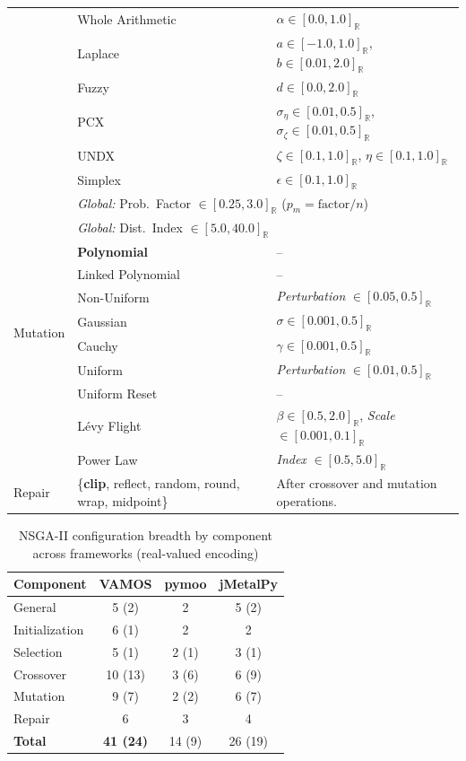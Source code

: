 \documentclass[journal]{IEEEtran}
\newcommand{\Realdomain}[1]{[#1]_{\mathbb{R}}}
\begin{document}
\begin{table}[htbp]
\begin{tabular}{lll}
 & Whole Arithmetic & $\alpha \in \Realdomain{0.0, 1.0}$ \\
 & Laplace & $a \in \Realdomain{-1.0, 1.0}$, $b \in \Realdomain{0.01, 2.0}$ \\
 & Fuzzy & $d \in \Realdomain{0.0, 2.0}$ \\
 & PCX & $\sigma_\eta \in \Realdomain{0.01, 0.5}$, $\sigma_\zeta \in \Realdomain{0.01, 0.5}$ \\
 & UNDX & $\zeta \in \Realdomain{0.1, 1.0}$, $\eta \in \Realdomain{0.1, 1.0}$ \\
 & Simplex & $\epsilon \in \Realdomain{0.1, 1.0}$ \\ \midrule
\multirow{11}{*}{Mutation} & \multicolumn{2}{l}{\textit{Global:} Prob.\ Factor $\in \Realdomain{0.25, 3.0}$ ($p_m = \text{factor}/n$)} \\
 & \multicolumn{2}{l}{\textit{Global:} Dist.\ Index $\in \Realdomain{5.0, 40.0}$} \\
 & \textbf{Polynomial} & -- \\
 & Linked Polynomial & -- \\
 & Non-Uniform & \textit{Perturbation} $\in \Realdomain{0.05, 0.5}$ \\
 & Gaussian & $\sigma \in \Realdomain{0.001, 0.5}$ \\
 & Cauchy & $\gamma \in \Realdomain{0.001, 0.5}$ \\
 & Uniform & \textit{Perturbation} $\in \Realdomain{0.01, 0.5}$ \\
 & Uniform Reset & -- \\
 & L\'evy Flight & $\beta \in \Realdomain{0.5, 2.0}$, \textit{Scale} $\in \Realdomain{0.001, 0.1}$ \\
 & Power Law & \textit{Index} $\in \Realdomain{0.5, 5.0}$ \\ \midrule
\multirow{1}{*}{Repair} & \{\textbf{clip}, reflect, random, round, wrap, midpoint\} & After crossover and mutation operations. \\ \bottomrule
\end{tabular}%
\end{table}

\begin{table}[htbp]
\centering
\caption{NSGA-II configuration breadth by component across frameworks (real-valued encoding)}
\label{tab:parameter_space_summary}
\begin{tabular}{lccc}
\toprule
\textbf{Component} & \textbf{VAMOS} & \textbf{pymoo} & \textbf{jMetalPy} \\
\midrule
General & 5 (2) & 2 & 5 (2) \\
Initialization & 6 (1) & 2 & 2 \\
Selection & 5 (1) & 2 (1) & 3 (1) \\
Crossover & 10 (13) & 3 (6) & 6 (9) \\
Mutation & 9 (7) & 2 (2) & 6 (7) \\
Repair & 6 & 3 & 4 \\
\midrule
\textbf{Total} & \textbf{41 (24)} & 14 (9) & 26 (19) \\
\bottomrule
\end{tabular}
\end{table}
\end{document}
